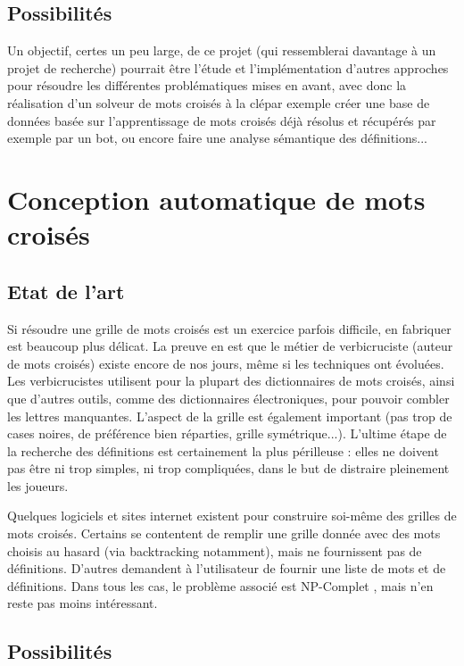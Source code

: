 \documentclass{article}
\begin{document}
\subsection{Possibilités}

Un objectif, certes un peu large, de ce projet (qui ressemblerai davantage à un projet de recherche) pourrait être l'étude et l'implémentation d'autres approches pour résoudre les différentes problématiques mises en avant, avec donc la réalisation d'un solveur de mots croisés à la clépar exemple créer une base de données basée sur l'apprentissage de mots croisés déjà résolus et récupérés par exemple par un bot, ou encore faire une analyse sémantique des définitions...

\section{Conception automatique de mots croisés}

\subsection{Etat de l'art}

Si résoudre une grille de mots croisés est un exercice parfois difficile, en fabriquer est beaucoup plus délicat. La preuve en est que le métier de verbicruciste (auteur de mots croisés) existe encore de nos jours, même si les techniques ont évoluées. Les verbicrucistes utilisent pour la plupart des dictionnaires de mots croisés, ainsi que d'autres outils, comme des dictionnaires électroniques, pour pouvoir combler les lettres manquantes. L'aspect de la grille est également important (pas trop de cases noires, de préférence bien réparties, grille symétrique...). L'ultime étape de la recherche des définitions est certainement la plus périlleuse : elles ne doivent pas être ni trop simples, ni trop compliquées, dans le but de distraire pleinement les joueurs.

Quelques logiciels et sites internet existent pour construire soi-même des grilles de mots croisés. Certains se contentent de remplir une grille donnée avec des mots choisis au hasard (via backtracking notamment), mais ne fournissent pas de définitions. D'autres demandent à l'utilisateur de fournir une liste de mots et de définitions. Dans tous les cas, le problème associé est NP-Complet \cite{NP-complete}, mais n'en reste pas moins intéressant.

\subsection{Possibilités}
\end{document}

